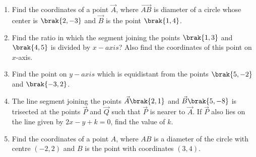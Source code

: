 \begin{enumerate}
\item Find the coordinates of a point $\vec{A}$, where $\vec{AB}$ is diameter of a circle whose center is $\brak{2,-3}$ and $\vec{B}$ is the point $\brak{1,4}$.
\item Find the ratio in which the segment joining the points $\brak{1, 3}$ and $\brak{4, 5}$ is divided by $x-axis$? Also find the coordinates of this point on  $x$-axis.
\item Find the point on $y-axis$ which is equidistant from the points $\brak{5, -2}$ and $\brak{-3, 2}$.    
\item The line segment joining the points $\vec{A}\brak{2, 1}$ and $\vec{B}\brak{5, -8}$ is trisected at the points $\vec{P}$ and $\vec{Q}$ such that $\vec{P}$ is nearer to $\vec{A}$. If $\vec{P}$ also lies on the line given by $2x-y+k=0$, find the value of $k$.
\item Find the coordinates of a point $A$, where $AB$ is a diameter of the circle with centre $(-2, 2)$ and $B$ is the point with coordinates $(3, 4)$.
\end{enumerate}